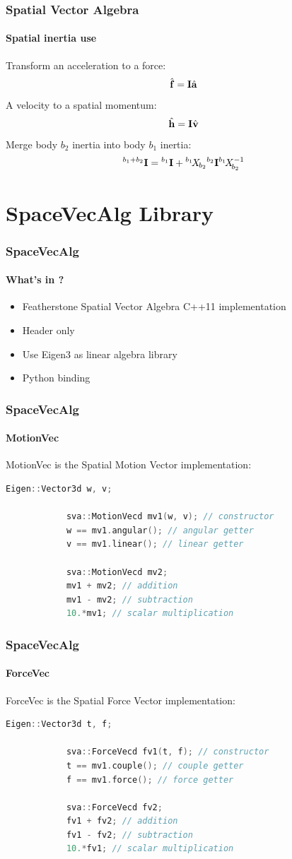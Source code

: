 \documentclass{beamer}
\begin{document}
  	\begin{frame}
		\frametitle{Spatial Vector Algebra}
		\framesubtitle{Spatial inertia use}
		Transform an acceleration to a force:
		$$
		\forcevecHat = \inertia \accelvecHat
		$$
		A velocity to a spatial momentum:
		$$
		\momentumHat = \inertia \velocityvecHat
		$$
		Merge body $ b_2 $ inertia into body $ b_1 $ inertia:
		$$
		{}^{b_1+b_2}\inertia = {}^{b_1}\inertia + \transform{{b_2}}{{b_1}} {}^{b_2}\inertia\transformInv{{b_2}}{{b_1}}
		$$
	\end{frame}
	\section{SpaceVecAlg Library}

  	\begin{frame}
		\frametitle{SpaceVecAlg}
		\framesubtitle{What's in ?}
		\begin{itemize}
			\item Featherstone Spatial Vector Algebra C++11 implementation
			\item Header only
			\item Use Eigen3 as linear algebra library
			\item Python binding
		\end{itemize}
	\end{frame}


  	\begin{frame}[fragile]
		\frametitle{SpaceVecAlg}
		\framesubtitle{MotionVec}
		MotionVec is the Spatial Motion Vector implementation:
		\begin{lstlisting}[language=C++]
			Eigen::Vector3d w, v;

			sva::MotionVecd mv1(w, v); // constructor
			w == mv1.angular(); // angular getter
			v == mv1.linear(); // linear getter

			sva::MotionVecd mv2;
			mv1 + mv2; // addition
			mv1 - mv2; // subtraction
			10.*mv1; // scalar multiplication
		\end{lstlisting}
	\end{frame}


  	\begin{frame}[fragile]
		\frametitle{SpaceVecAlg}
		\framesubtitle{ForceVec}
		ForceVec is the Spatial Force Vector implementation:
		\begin{lstlisting}[language=C++]
			Eigen::Vector3d t, f;

			sva::ForceVecd fv1(t, f); // constructor
			t == mv1.couple(); // couple getter
			f == mv1.force(); // force getter

			sva::ForceVecd fv2;
			fv1 + fv2; // addition
			fv1 - fv2; // subtraction
			10.*fv1; // scalar multiplication
		\end{lstlisting}
	\end{frame}
\end{document}
